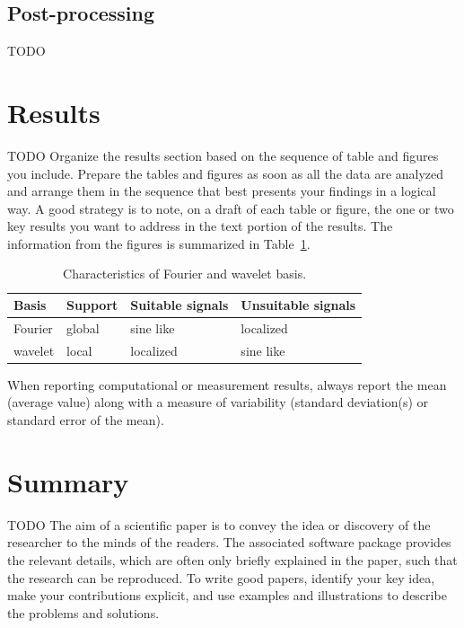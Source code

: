 \documentclass[10pt,conference,compsocconf]{IEEEtran}
\begin{document}
\subsection{Post-processing}
TODO


\section{Results}
\label{sec:results}

TODO
Organize the results section based on the sequence of table and
figures you include. Prepare the tables and figures as soon as all
the data are analyzed and arrange them in the sequence that best
presents your findings in a logical way. A good strategy is to note,
on a draft of each table or figure, the one or two key results you
want to address in the text portion of the results.
The information from the figures is
summarized in Table~\ref{tab:fourier-wavelet}.

\begin{table}[htbp]
  \centering
  \begin{tabular}[c]{|l||l|l|l|}
    \hline
    Basis&Support&Suitable signals&Unsuitable signals\\
    \hline
    Fourier&global&sine like&localized\\
    wavelet&local&localized&sine like\\
    \hline
  \end{tabular}
  \caption{Characteristics of Fourier and wavelet basis.}
  \label{tab:fourier-wavelet}
\end{table}

When reporting computational or measurement results, always
report the mean (average value) along with a measure of variability
(standard deviation(s) or standard error of the mean).







\section{Summary}

TODO
The aim of a scientific paper is to convey the idea or discovery of
the researcher to the minds of the readers. The associated software
package provides the relevant details, which are often only briefly
explained in the paper, such that the research can be reproduced.
To write good papers, identify your key idea, make your contributions
explicit, and use examples and illustrations to describe the problems
and solutions.





\end{document}
